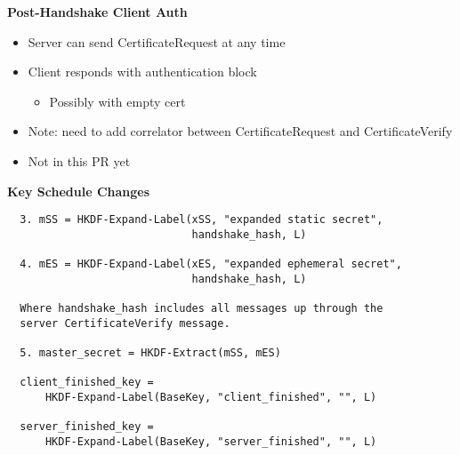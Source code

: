 \documentclass[helvetica]{seminar}
\newcommand{\heading}[1]{%
  \begin{center} 
    \large\bf 
    #1 
  \end{center} 
  \vspace{.4 in}}
\begin{document}
\begin{slide}
\heading{Post-Handshake Client Auth}

\begin{itemize}
\item Server can send CertificateRequest at any time
\item Client responds with authentication block
  \begin{itemize}
  \item Possibly with empty cert
  \end{itemize}

\item Note: need to add correlator between CertificateRequest and CertificateVerify
\item Not in this PR yet
\end{itemize}

\end{slide}

\begin{slide}
\heading{Key Schedule Changes}

\begin{footnotesize}
\begin{verbatim}
  3. mSS = HKDF-Expand-Label(xSS, "expanded static secret",
                             handshake_hash, L)

  4. mES = HKDF-Expand-Label(xES, "expanded ephemeral secret",
                             handshake_hash, L)

  Where handshake_hash includes all messages up through the
  server CertificateVerify message.

  5. master_secret = HKDF-Extract(mSS, mES)

  client_finished_key =
      HKDF-Expand-Label(BaseKey, "client_finished", "", L)
  
  server_finished_key =
      HKDF-Expand-Label(BaseKey, "server_finished", "", L)
\end{verbatim}
\end{footnotesize}
\end{slide}
\end{document}
